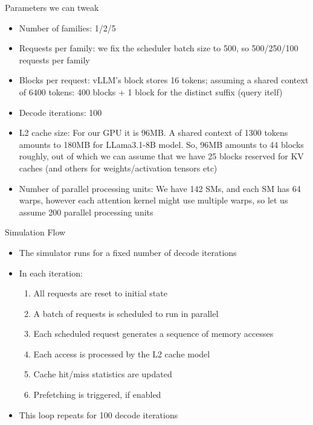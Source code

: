 \documentclass[Serif, 10pt, brown]{beamer}
\theoremstyle{example}
\theoremstyle{plain}
\newcounter{units}
\begin{document}
\begin{frame}{Parameters we can tweak}
    \begin{itemize}
        \item Number of families: 1/2/5
        \item Requests per family: we fix the scheduler batch size to 500, so 500/250/100 requests per family
        \item Blocks per request: vLLM's block stores 16 tokens; assuming a shared context of 6400 tokens: 400 blocks + 1 block for the distinct suffix (query itelf)
        \item Decode iterations: 100
        \item L2 cache size: For our GPU it is 96MB. A shared context of 1300 tokens amounts to 180MB for LLama3.1-8B model. So, 96MB amounts to 44 blocks roughly, out of which we can assume that we have 25 blocks reserved for KV caches (and others for weights/activation tensors etc)
        \item Number of parallel processing units: We have 142 SMs, and each SM has 64 warps, however each attention kernel might use multiple warps, so let us assume 200 parallel processing units
    \end{itemize}
\end{frame}


\begin{frame}{Simulation Flow}
    \begin{itemize}
        \item The simulator runs for a fixed number of decode iterations
        \item In each iteration:
        \begin{enumerate}
            \item All requests are reset to initial state
            \item A batch of requests is scheduled to run in parallel
            \item Each scheduled request generates a sequence of memory accesses
            \item Each access is processed by the L2 cache model
            \item Cache hit/miss statistics are updated
            \item Prefetching is triggered, if enabled
        \end{enumerate}
        \item This loop repeats for 100 decode iterations
    \end{itemize}
\end{frame}
\end{document}
